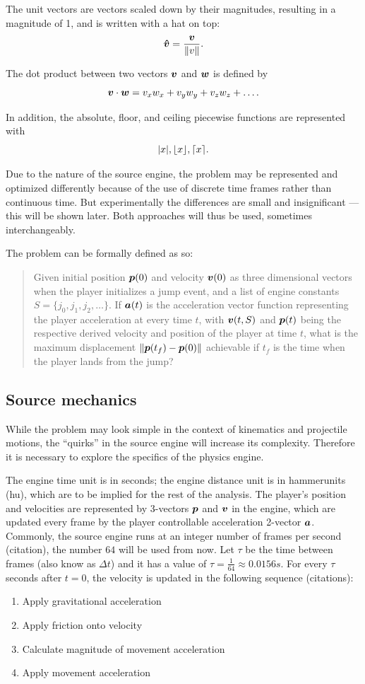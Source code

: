 The unit vectors are vectors scaled down by their magnitudes, resulting in a magnitude of 1, and is written with a hat on top:
\[
\boldsymbol{\hat{v}} = \frac{\boldsymbol{v}}{\|v\|}.
\]

The dot product between two vectors $\boldsymbol{v}$ and $\boldsymbol{w}$ is defined by
\[
\boldsymbol{v} \cdot \boldsymbol{w} = v_x w_x + v_y w_y + v_z w_z + \ldots.
\]

In addition, the absolute, floor, and ceiling piecewise functions are represented with
\[
    |x|, \floor*{x}, \ceil*{x}.
\]

Due to the nature of the source engine, the problem may be represented and optimized differently because of the use of discrete time frames rather than continuous time. But experimentally the differences are small and insignificant --- this will be shown later. Both approaches will thus be used, sometimes interchangeably.

The problem can be formally defined as so:
\begin{quote}
    Given initial position $\boldsymbol{p}(0)$ and velocity $\boldsymbol{v}(0)$ as three dimensional vectors when the player initializes a jump event, and a list of engine constants $S = \{j_0, j_1, j_2, \ldots\}$. If $\boldsymbol{a}(t)$ is the acceleration vector function representing the player acceleration at every time $t$, with $\boldsymbol{v}(t, S)$ and $\boldsymbol{p}(t)$ being the respective derived velocity and position of the player at time $t$, what is the maximum displacement $\|\boldsymbol{p}(t_f) - \boldsymbol{p}(0)\|$ achievable if $t_f$ is the time when the player lands from the jump?
\end{quote}

\subsection{Source mechanics}
\label{sec:source}
While the problem may look simple in the context of kinematics and projectile motions, the ``quirks'' in the source engine will increase its complexity. Therefore it is necessary to explore the specifics of the physics engine.

The engine time unit is in seconds; the engine distance unit is in hammerunits (hu), which are to be implied for the rest of the analysis. The player's position and velocities are represented by 3-vectors $\boldsymbol{p}$ and $\boldsymbol{v}$ in the engine, which are updated every frame by the player controllable acceleration 2-vector $\boldsymbol{a}$. Commonly, the source engine runs at an integer number of frames per second (citation), the number $64$ will be used from now. Let $\tau$ be the time between frames (also know as $\Delta t$) and it has a value of $\tau = \frac{1}{64} \approx 0.0156 \si{s}$. For every $\tau$ seconds after $t=0$, the velocity is updated in the following sequence (citations):
\begin{enumerate}
    \item Apply gravitational acceleration
    \item Apply friction onto velocity
    \item Calculate magnitude of movement acceleration
    \item Apply movement acceleration
\end{enumerate}

